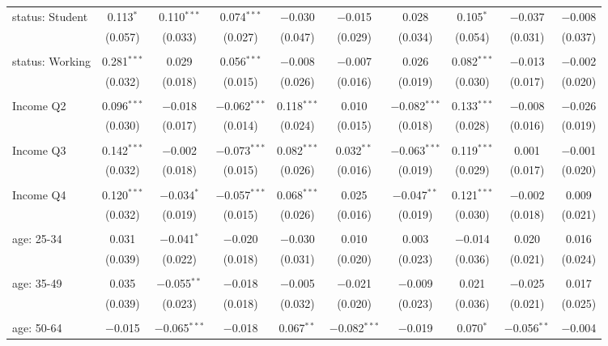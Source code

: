 \begin{tabular}{@{\extracolsep{5pt}}lccccccccc}
 status: Student & 0.113$^{*}$ & 0.110$^{***}$ & 0.074$^{***}$ & $-$0.030 & $-$0.015 & 0.028 & 0.105$^{*}$ & $-$0.037 & $-$0.008 \\ 
  & (0.057) & (0.033) & (0.027) & (0.047) & (0.029) & (0.034) & (0.054) & (0.031) & (0.037) \\ 
  & & & & & & & & & \\ 
 status: Working & 0.281$^{***}$ & 0.029 & 0.056$^{***}$ & $-$0.008 & $-$0.007 & 0.026 & 0.082$^{***}$ & $-$0.013 & $-$0.002 \\ 
  & (0.032) & (0.018) & (0.015) & (0.026) & (0.016) & (0.019) & (0.030) & (0.017) & (0.020) \\ 
  & & & & & & & & & \\ 
 Income Q2 & 0.096$^{***}$ & $-$0.018 & $-$0.062$^{***}$ & 0.118$^{***}$ & 0.010 & $-$0.082$^{***}$ & 0.133$^{***}$ & $-$0.008 & $-$0.026 \\ 
  & (0.030) & (0.017) & (0.014) & (0.024) & (0.015) & (0.018) & (0.028) & (0.016) & (0.019) \\ 
  & & & & & & & & & \\ 
 Income Q3 & 0.142$^{***}$ & $-$0.002 & $-$0.073$^{***}$ & 0.082$^{***}$ & 0.032$^{**}$ & $-$0.063$^{***}$ & 0.119$^{***}$ & 0.001 & $-$0.001 \\ 
  & (0.032) & (0.018) & (0.015) & (0.026) & (0.016) & (0.019) & (0.029) & (0.017) & (0.020) \\ 
  & & & & & & & & & \\ 
 Income Q4 & 0.120$^{***}$ & $-$0.034$^{*}$ & $-$0.057$^{***}$ & 0.068$^{***}$ & 0.025 & $-$0.047$^{**}$ & 0.121$^{***}$ & $-$0.002 & 0.009 \\ 
  & (0.032) & (0.019) & (0.015) & (0.026) & (0.016) & (0.019) & (0.030) & (0.018) & (0.021) \\ 
  & & & & & & & & & \\ 
 age: 25-34 & 0.031 & $-$0.041$^{*}$ & $-$0.020 & $-$0.030 & 0.010 & 0.003 & $-$0.014 & 0.020 & 0.016 \\ 
  & (0.039) & (0.022) & (0.018) & (0.031) & (0.020) & (0.023) & (0.036) & (0.021) & (0.024) \\ 
  & & & & & & & & & \\ 
 age: 35-49 & 0.035 & $-$0.055$^{**}$ & $-$0.018 & $-$0.005 & $-$0.021 & $-$0.009 & 0.021 & $-$0.025 & 0.017 \\ 
  & (0.039) & (0.023) & (0.018) & (0.032) & (0.020) & (0.023) & (0.036) & (0.021) & (0.025) \\ 
  & & & & & & & & & \\ 
 age: 50-64 & $-$0.015 & $-$0.065$^{***}$ & $-$0.018 & 0.067$^{**}$ & $-$0.082$^{***}$ & $-$0.019 & 0.070$^{*}$ & $-$0.056$^{**}$ & $-$0.004 \\ 

\end{tabular}
